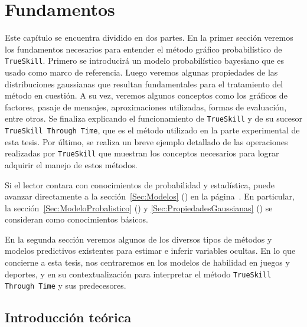 \documentclass[11pt,twoside,spanish]{report} %
\begin{document}
\chapter{Fundamentos}



Este cap\'itulo se encuentra dividido en dos partes.
En la primer secci\'on veremos los fundamentos necesarios para entender el m\'etodo gr\'afico probabil\'istico de \texttt{TrueSkill}.
Primero se introducir\'a un modelo probabil\'istico bayesiano que es usado como marco de referencia.
Luego veremos algunas propiedades de las distribuciones gaussianas que resultan fundamentales para el tratamiento del m\'etodo en cuesti\'on.
A su vez, veremos algunos conceptos como los gr\'aficos de factores, pasaje de mensajes, aproximaciones utilizadas, formas de evaluaci\'on, entre otros.
Se finaliza explicando el funcionamiento de \texttt{TrueSkill} y de su sucesor \texttt{TrueSkill Through Time}, que es el m\'etodo utilizado en la parte experimental de esta tesis.
Por \'ultimo, se realiza un breve ejemplo detallado de las operaciones realizadas por \texttt{TrueSkill} que muestran los conceptos necesarios para lograr adquirir el manejo de estos m\'etodos.

Si el lector contara con conocimientos de probabilidad y estad\'istica, puede avanzar directamente a la secci\'on~\ref{Sec:Modelos} () en la p\'agina~\pageref{Sec:Modelos}.
En particular, la secci\'on~\ref{Sec:ModeloProbalistico} () y \ref{Sec:PropiedadesGaussianas} () se consideran como conocimientos b\'asicos.

En la segunda secci\'on veremos algunos de los diversos tipos de m\'etodos y modelos predictivos existentes para estimar e inferir variables ocultas.
En lo que concierne a esta tesis, nos centraremos en los modelos de habilidad en juegos y deportes, y en su contextualizaci\'on para interpretar el m\'etodo \texttt{TrueSkill Through Time} y sus predecesores.

\section{Introducci\'on te\'orica}
\end{document}
